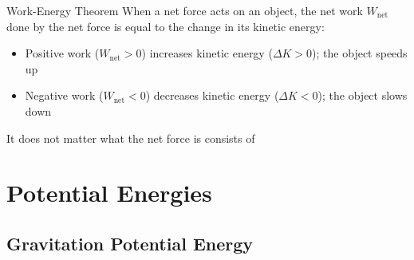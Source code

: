 \documentclass[12pt,compress,aspectratio=169]{beamer}
\begin{document}
\begin{frame}{Work-Energy Theorem}
  When a net force acts on an object, the net work $W_\text{net}$ done by the
  net force is equal to the change in its kinetic energy:

  
  \begin{itemize}
  \item\vspace{-.1in}Positive work ($W_\text{net}>0$) increases kinetic energy
    ($\Delta K>0$); the object speeds up
  \item Negative work ($W_\text{net}<0$) decreases kinetic energy
    ($\Delta K<0$); the object slows down
  \end{itemize}
  It does not matter what the net force is consists of
\end{frame}



\section{Potential Energies}%

%
%


\subsection{Gravitation Potential Energy}
\end{document}
